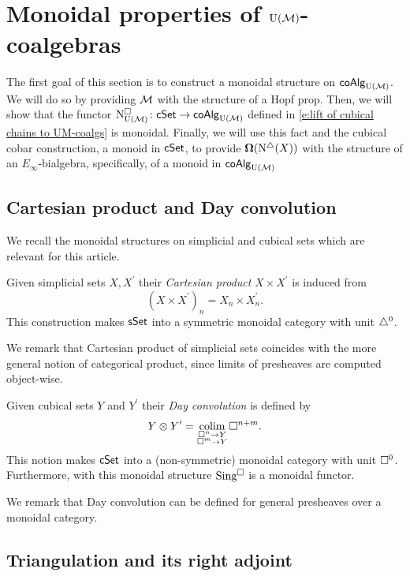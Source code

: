 
\section{Monoidal properties of \texorpdfstring{${\operatorname{U}(\mathcal{M})}$}{}-coalgebras}

The first goal of this section is to construct a monoidal structure on $\mathsf{coAlg}_{\operatorname{U}(\mathcal{M})}$.
We will do so by providing $\mathcal{M}$ with the structure of a Hopf prop.
Then, we will show that the functor $\operatorname{N^{\square}_{{\operatorname{U}(\mathcal{M})}}} \colon \mathsf{cSet} \to \mathsf{coAlg}_{{\operatorname{U}(\mathcal{M})}}$ defined in \eqref{e:lift of cubical chains to UM-coalgs} is monoidal.
Finally, we will use this fact and the cubical cobar construction, a monoid in $\mathsf{cSet}$, to provide $\operatorname{\mathbf{\Omega}}(\operatorname{N^{\triangle}}(X))$ with the structure of an $E_{\infty}$-bialgebra, specifically, of a monoid in $\mathsf{coAlg}_{{\operatorname{U}(\mathcal{M})}}$

\subsection{Cartesian product and Day convolution} \label{ss:day convolution}

We recall the monoidal structures on simplicial and cubical sets which are relevant for this article.

Given simplicial sets $X, X^\prime$ their \textit{Cartesian product} $X \times X^\prime$ is induced from
\[
(X \times X^\prime)_n = X_n \times X^\prime_n.
\]
This construction makes $\mathsf{sSet}$ into a symmetric monoidal category with unit $\triangle^0$.

We remark that Cartesian product of simplicial sets coincides with the more general notion of categorical product, since limits of presheaves are computed object-wise.

Given cubical sets $Y$ and $Y^\prime$ their \textit{Day convolution} is defined by
\[
Y \otimes Y^\prime = \operatorname*{colim}_{\substack{\square^n \to Y \\ \square^{m} \to Y}} \square^{n+m}.
\]
This notion makes $\mathsf{cSet}$ into a (non-symmetric) monoidal category with unit $\square^0$.
Furthermore, with this monoidal structure $\operatorname{Sing^{\square}}$ is a monoidal functor.

We remark that Day convolution can be defined for general presheaves over a monoidal category.


\subsection{Triangulation and its right adjoint} \label{ss:triangulation and its adjoint}

